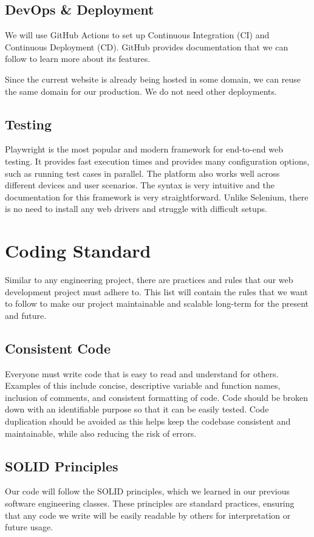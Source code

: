 \documentclass{article}
\begin{document}
\subsection{DevOps \& Deployment}
We will use GitHub Actions to set up Continuous Integration (CI) and Continuous Deployment (CD). GitHub provides documentation that we can follow to learn more about its features.

Since the current website is already being hosted in some domain, we can reuse the same domain for our production. We do not need other deployments.

\subsection{Testing}
Playwright is the most popular and modern framework for end-to-end web testing. It provides fast execution times and provides many configuration options, such as running test cases in parallel. The platform also works well across different devices and user scenarios. The syntax is very intuitive and the documentation for this framework is very straightforward. Unlike Selenium, there is no need to install any web drivers and struggle with difficult setups.

\section{Coding Standard}
Similar to any engineering project, there are practices and rules that our web development project must adhere to. This list will contain the rules that we want to follow to make our project maintainable and scalable long-term for the present and future.

\subsection{Consistent Code}
Everyone must write code that is easy to read and understand for others. Examples of this include concise, descriptive variable and function names, inclusion of comments, and consistent formatting of code. Code should be broken down with an identifiable purpose so that it can be easily tested. Code duplication should be avoided as this helps keep the codebase consistent and maintainable, while also reducing the risk of errors.

\subsection{SOLID Principles}
Our code will follow the SOLID principles, which we learned in our previous software engineering classes. These principles are standard practices, ensuring that any code we write will be easily readable by others for interpretation or future usage.
\end{document}
